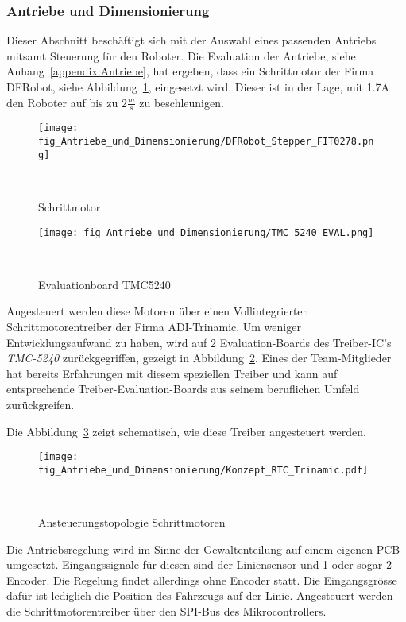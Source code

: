 \documentclass[main.tex]{subfiles} %
\begin{document}

\subsubsection{Antriebe und Dimensionierung}

Dieser Abschnitt beschäftigt sich mit der Auswahl eines passenden Antriebs
mitsamt Steuerung für den Roboter. Die Evaluation der Antriebe, siehe
Anhang~\ref{appendix:Antriebe}, hat ergeben, dass ein Schrittmotor der Firma
DFRobot, siehe Abbildung~\ref{Schrittmotor_FIT0278}, eingesetzt wird. Dieser
ist in der Lage, mit 1.7A den Roboter auf bis zu $2\frac{m}{s}$ zu
beschleunigen.

\begin{figure}[H]
    \centering
    \texttt{[image: fig\_Antriebe\_und\_Dimensionierung/DFRobot\_Stepper\_FIT0278.png]}
    \caption{Schrittmotor}~\label{Schrittmotor_FIT0278}
\end{figure}

\begin{figure}[H]
    \centering
    \texttt{[image: fig\_Antriebe\_und\_Dimensionierung/TMC\_5240\_EVAL.png]}
    \caption{Evaluationboard TMC5240}~\label{Schrittmotorentreiber_EVAL}
\end{figure}

Angesteuert werden diese Motoren über einen Vollintegrierten
Schrittmotorentreiber der Firma ADI-Trinamic. Um weniger Entwicklungsaufwand zu
haben, wird auf 2 Evaluation-Boards des Treiber-IC's \textit{TMC-5240}
zurückgegriffen, gezeigt in Abbildung~\ref{Schrittmotorentreiber_EVAL}. Eines
der Team-Mitglieder hat bereits Erfahrungen mit diesem speziellen Treiber und
kann auf entsprechende Treiber-Evaluation-Boards aus seinem beruflichen Umfeld
zurückgreifen.

Die Abbildung~\ref{Ansteuerungstopologie_Schrittmotorentreiber} zeigt
schematisch, wie diese Treiber angesteuert werden.

\begin{figure}[H]
    \centering
    \texttt{[image: fig\_Antriebe\_und\_Dimensionierung/Konzept\_RTC\_Trinamic.pdf]}
    \caption{Ansteuerungstopologie Schrittmotoren}~\label{Ansteuerungstopologie_Schrittmotorentreiber}
\end{figure}

Die Antriebsregelung wird im Sinne der Gewaltenteilung auf einem eigenen PCB
umgesetzt. Eingangssignale für diesen sind der Liniensensor und 1 oder sogar 2
Encoder. Die Regelung findet allerdings ohne Encoder statt. Die Eingangsgrösse
dafür ist lediglich die Position des Fahrzeugs auf der Linie. Angesteuert
werden die Schrittmotorentreiber über den SPI-Bus des Mikrocontrollers.
\end{document}
